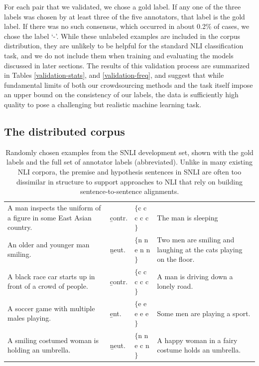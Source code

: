 For each pair that we validated, we chose a gold label. If any one of the three labels was chosen by at least three of the five annotators, that label is the gold label. If there was no such consensus, which occurred in about 0.2\% of cases, we chose the label `-'. While these unlabeled examples are included in the corpus distribution, they are unlikely to be helpful for the standard NLI classification task, and we do not include them when training and evaluating the models discussed in later sections. The results of this validation process are summarized in Tables \ref{validation-stats}, and \ref{validation-freq}, and suggest that while fundamental limits of both our crowdsourcing methods and the task itself impose an upper bound on the consistency of our labels, the data is sufficiently high quality to pose a challenging but realistic machine learning task.

\subsection{The distributed corpus}

\begin{table}
  \centering\footnotesize
  \begin{tabular}{p{6cm}p{0.75cm}p{1.4cm}p{6cm}}
  \toprule
A man inspects the uniform of a figure in some East Asian country. & \b{contr.}& \t{$\{$c c c c c$\}$} & The man is sleeping\\
\rule{0pt}{3ex}An older and younger man smiling. & \b{neut.}& \t{$\{$n n e n n$\}$} & Two men are smiling and laughing at the cats playing on the floor.\\
\rule{0pt}{3ex}A black race car starts up in front of a crowd of people. & \b{contr.}& \t{$\{$c c c c c$\}$} & A man is driving down a lonely road.\\
\rule{0pt}{3ex}A soccer game with multiple males playing. & \b{ent.}& \t{$\{$e e e e e$\}$} & Some men are playing a sport.\\
\rule{0pt}{3ex}A smiling costumed woman is holding an umbrella. & \b{neut.}& \t{$\{$n n e c n$\}$} & A happy woman in a fairy costume holds an umbrella.\\
    \bottomrule
  \end{tabular}
  \caption{\label{snli-examples}Randomly chosen examples from the SNLI development set, shown with the gold labels and the full set of annotator labels (abbreviated). Unlike in many existing NLI corpora, the premise and hypothesis sentences in SNLI are often too dissimilar in structure to support approaches to NLI that rely on building sentence-to-sentence alignments.}
\end{table}

